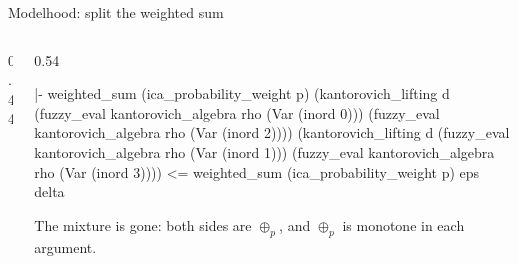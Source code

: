 \documentclass[10pt,aspectratio=169]{beamer}
\begin{document}
            \begin{frame}[fragile]{Modelhood: split the weighted sum}
                \begin{columns}[T]
                    \begin{column}{0.44\textwidth}
                    \end{column}
                    \begin{column}{0.54\textwidth}
                        \begin{goalbox}[title={after
                                    \texttt{apply: (le\_trans
                            (kantorovich\_convex\_mixture ...))}}]
                            \begin{gconc}
|- weighted_sum (ica_probability_weight p)
     (kantorovich_lifting d
        (fuzzy_eval kantorovich_algebra rho (Var (inord 0)))
        (fuzzy_eval kantorovich_algebra rho (Var (inord 2))))
     (kantorovich_lifting d
        (fuzzy_eval kantorovich_algebra rho (Var (inord 1)))
        (fuzzy_eval kantorovich_algebra rho (Var (inord 3))))
   <= weighted_sum (ica_probability_weight p) eps delta
                            \end{gconc}
                        \end{goalbox}
                        {\footnotesize The mixture is gone: both sides are
                            $\oplus_p$, and $\oplus_p$ is monotone in each
                        argument.}
                    \end{column}
                \end{columns}
            \end{frame}
\end{document}
